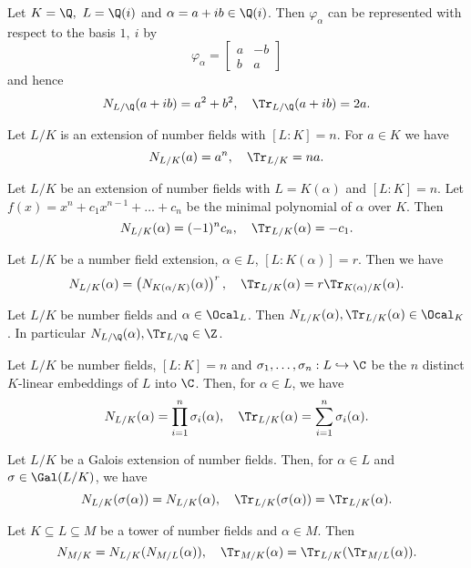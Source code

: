 \begin{exmp*}
	Let \( K = \Q,\ L = \Q(i) \) and \( \alpha = a+ib \in \Q(i) \).
	Then \( \varphi_\alpha \) can be represented with respect to the basis \( 1,\ i \) by
	\[ \varphi_\alpha = \begin{bmatrix}
		a & -b \\ b & a
	\end{bmatrix} \]
	and hence
	\[ N_{L/\Q}(a+ib) = a^2+b^2,\quad \Tr_{L/\Q}(a+ib) = 2a. \]
\end{exmp*}

\begin{lem}
	Let \( L/K \) is an extension of number fields with \( [L:K] = n \). For \( a \in K \) we have
	\[ N_{L/K}(a) = a^n,\quad \Tr_{L/K} = na. \]
\end{lem}

\begin{lem}
	Let \( L/K \) be an extension of number fields with \( L=K(\alpha) \) and \( [L:K]=n \).
	Let \( f(x) = x^n + c_1x^{n-1} + \dots + c_n \) be the minimal polynomial of \( \alpha \) over \( K \).
	Then
	\[ N_{L/K}(\alpha) = (-1)^n c_n,\quad \Tr_{L/K}(\alpha) = -c_1. \]
\end{lem}

\begin{lem}
	Let \( L/K \) be a number field extension, \( \alpha \in L \), \( [L:K(\alpha)] = r \).
	Then we have
	\[ N_{L/K}(\alpha) = \left( N_{K(\alpha/K)}(\alpha) \right)^r,\quad \Tr_{L/K}(\alpha) = r \Tr_{K(\alpha)/K}(\alpha). \]
\end{lem}

\begin{cor}\label{cor:10}
	Let \( L/K \) be number fields and \( \alpha \in \Ocal_L \).
	Then \( N_{L/K}(\alpha), \Tr_{L/K}(\alpha) \in \Ocal_K \).
	In particular \( N_{L/\Q}(\alpha), \Tr_{L/\Q} \in \Z \).
\end{cor}

\begin{thmn}
	Let \( L/K \) be number fields, \( [L:K] = n \) and \( \sigma_1, \dotsc, \sigma_n: L \hookrightarrow \C \) be the \( n \) distinct \( K \)-linear embeddings of \( L \) into \( \C \).
	Then, for \( \alpha \in L \), we have
	\[ N_{L/K}(\alpha) = \prod_{i=1}^{n} \sigma_i(\alpha),\quad \Tr_{L/K}(\alpha) = \sum_{i=1}^{n} \sigma_i(\alpha). \]
\end{thmn}

\begin{cor}
	Let \( L/K \) be a Galois extension of number fields.
	Then, for \( \alpha \in L \) and \( \sigma \in \Gal(L/K) \), we have
	\[ N_{L/K}(\sigma(\alpha)) = N_{L/K}(\alpha),\quad \Tr_{L/K}(\sigma(\alpha)) = \Tr_{L/K}(\alpha). \]
\end{cor}

\begin{thmn}
	Let \( K \subseteq L \subseteq M \) be a tower of number fields and \( \alpha \in M \).
	Then
	\[ N_{M/K} = N_{L/K}(N_{M/L}(\alpha)),\quad \Tr_{M/K}(\alpha) = \Tr_{L/K}(\Tr_{M/L}(\alpha)). \]
\end{thmn}